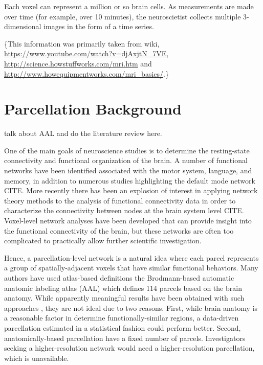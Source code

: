 {Each voxel can represent a million or so brain cells. As measurements
are made over time (for example, over 10 minutes), the neuroscietist
collects multiple 3-dimensional images in the form of a time series. 

\{This information was primarily taken from wiki,
\url{https://www.youtube.com/watch?v=djAxjtN\_7VE},
\url{http://science.howstuffworks.com/mri.htm} and
\url{http://www.howequipmentworks.com/mri\_basics/}.\}
}

\section{Parcellation Background}

{\color{red} talk about AAL and do the literature review here.}

{\color{blue}
One of the main goals of neuroscience studies is to determine
the resting-state connectivity and functional organization of the brain.
A
number of functional networks have been identified associated with
the motor system, language, and memory, in addition to numerous
studies highlighting the default mode network CITE.
More recently there has been an explosion of interest in applying
network theory methods to the analysis of functional connectivity
data in order to characterize the connectivity between nodes at the
brain system level CITE.
Voxel-level network analyses have been developed
that can provide insight into the functional connectivity
of the brain, but these networks are often too complicated to practically
allow further scientific investigation.

Hence, a parcellation-level network is a natural idea where
each parcel represents a group of spatially-adjacent voxels that
have similar functional behaviors. 
Many authors have used atlas-based definitions the Brodmann-based
automatic anatomic labeling atlas (AAL) \citep{tzourio2002automated} which defines 114 parcels based on the brain
anatomy.
While apparently meaningful results have
been obtained with such approaches \citep{hartman2011role, he2009uncovering, liu2008disrupted, lynall2010functional, power2011functional, salvador2005neurophysiological, spoormaker2010development, supekar2008network, tian2011hemisphere, wang2009parcellation}, they are not ideal due to two reasons.
First, while brain anatomy is a reasonable factor in determine functionally-similar
regions, a data-driven parcellation estimated in a statistical fashion
could perform better. Second, anatomically-based parcellation have a fixed
number of parcels. Investigators seeking a higher-resolution network would
need a higher-resolution parcellation, which is unavailable.

}
